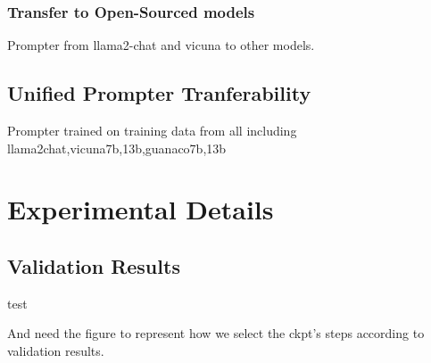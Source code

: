 \documentclass{article}
\begin{document}
\subsubsection{Transfer to Open-Sourced models}
Prompter from llama2-chat and vicuna to other models.

\subsection{Unified Prompter Tranferability}
Prompter trained on training data from all including llama2chat,vicuna7b,13b,guanaco7b,13b    




\appendix
\section{Experimental Details}
\subsection{Validation Results}
test

And need the figure to represent how we select the ckpt's steps according to validation results.
\end{document}
